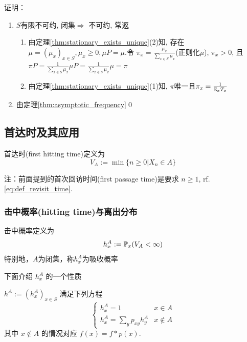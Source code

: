 证明：
\begin{enumerate}
    \item $S$有限不可约, 闭集$\Rightarrow$ 不可约, 常返
    \begin{enumerate}
        \item 由定理\ref{thm:stationary_exists_unique}(2)知, 存在$\mu=(\mu_x)_{x\in S},\mu_x\geq 0, \mu P=\mu$.令 $\pi_x=\frac{\mu_x}{\sum_{x\in S}\mu_x}$(正则化$\mu$), $\pi_x>0$, 且 $\pi P=\frac{1}{\sum_{x\in S}\mu_x}\mu P=\frac{1}{\sum_{x\in S}\mu_x}\mu=\pi$
        \item 由定理\ref{thm:stationary_exists_unique}(1)知, $\pi$唯一且$\pi_x=\frac{1}{\mathbb E_xT_x}$
    \end{enumerate}
    \item 由定理\ref{thm:asymptotic_frequency}\qed
\end{enumerate}

\subsection{首达时及其应用}

\begin{definition}[首达时]
    首达时(first hitting time)定义为
    \begin{equation}
        V_A:=\min\{n\geq 0|X_n\in A\}
        \label{eq:FHT}
    \end{equation}
\end{definition}

注：前面提到的首次回访时间(first passage time)是要求 $n\geq 1$, rf.\eqref{eq:def_revisit_time}.

\subsubsection{击中概率(hitting time)与离出分布}

\begin{definition}[击中概率]
    击中概率定义为
    \begin{equation}
        h_x^A:=\mathbb{P}_x(V_A<\infty)
        \label{eq:HT}
    \end{equation}
    特别地，$A$为闭集，称$h_x^A$为吸收概率
\end{definition}

下面介绍 $h_x^A$ 的一个性质

\begin{lemma}
    $h^A:=(h_x^A)_{x\in S}$ 满足下列方程
    \[
    \begin{cases}
        h_x^A=1 & x\in A\\
        h_x^A=\sum_y p_{xy}h_y^A & x\notin A
    \end{cases}
    \]
    其中 $x\notin A$ 的情况对应 $f(x)=f*p(x)$.
\end{lemma}

